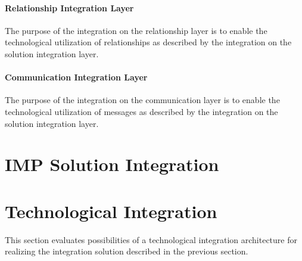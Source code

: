 \paragraph{Relationship Integration Layer} The purpose of the integration on the relationship layer is to enable the technological utilization of relationships as described by the integration on the solution integration layer. 

\paragraph{Communication Integration Layer} The purpose of the integration on the communication layer is to enable the technological utilization of messages as described by the integration on the solution integration layer.

\section{IMP Solution Integration}



\section{Technological Integration}

This section evaluates possibilities of a technological integration architecture for realizing the integration solution described in the previous section.

